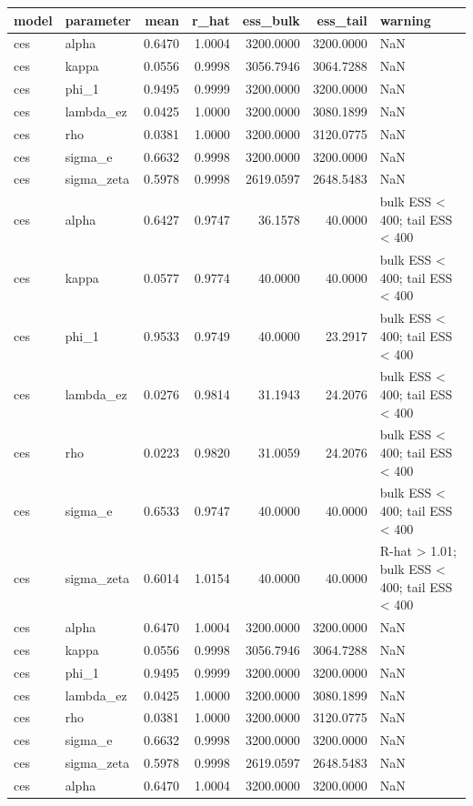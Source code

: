 \begin{tabular}{llrrrrl}
\toprule
model & parameter & mean & r\_hat & ess\_bulk & ess\_tail & warning \\
\midrule
ces & alpha & 0.6470 & 1.0004 & 3200.0000 & 3200.0000 & NaN \\
ces & kappa & 0.0556 & 0.9998 & 3056.7946 & 3064.7288 & NaN \\
ces & phi\_1 & 0.9495 & 0.9999 & 3200.0000 & 3200.0000 & NaN \\
ces & lambda\_ez & 0.0425 & 1.0000 & 3200.0000 & 3080.1899 & NaN \\
ces & rho & 0.0381 & 1.0000 & 3200.0000 & 3120.0775 & NaN \\
ces & sigma\_e & 0.6632 & 0.9998 & 3200.0000 & 3200.0000 & NaN \\
ces & sigma\_zeta & 0.5978 & 0.9998 & 2619.0597 & 2648.5483 & NaN \\
ces & alpha & 0.6427 & 0.9747 & 36.1578 & 40.0000 & bulk ESS < 400; tail ESS < 400 \\
ces & kappa & 0.0577 & 0.9774 & 40.0000 & 40.0000 & bulk ESS < 400; tail ESS < 400 \\
ces & phi\_1 & 0.9533 & 0.9749 & 40.0000 & 23.2917 & bulk ESS < 400; tail ESS < 400 \\
ces & lambda\_ez & 0.0276 & 0.9814 & 31.1943 & 24.2076 & bulk ESS < 400; tail ESS < 400 \\
ces & rho & 0.0223 & 0.9820 & 31.0059 & 24.2076 & bulk ESS < 400; tail ESS < 400 \\
ces & sigma\_e & 0.6533 & 0.9747 & 40.0000 & 40.0000 & bulk ESS < 400; tail ESS < 400 \\
ces & sigma\_zeta & 0.6014 & 1.0154 & 40.0000 & 40.0000 & R-hat > 1.01; bulk ESS < 400; tail ESS < 400 \\
ces & alpha & 0.6470 & 1.0004 & 3200.0000 & 3200.0000 & NaN \\
ces & kappa & 0.0556 & 0.9998 & 3056.7946 & 3064.7288 & NaN \\
ces & phi\_1 & 0.9495 & 0.9999 & 3200.0000 & 3200.0000 & NaN \\
ces & lambda\_ez & 0.0425 & 1.0000 & 3200.0000 & 3080.1899 & NaN \\
ces & rho & 0.0381 & 1.0000 & 3200.0000 & 3120.0775 & NaN \\
ces & sigma\_e & 0.6632 & 0.9998 & 3200.0000 & 3200.0000 & NaN \\
ces & sigma\_zeta & 0.5978 & 0.9998 & 2619.0597 & 2648.5483 & NaN \\
ces & alpha & 0.6470 & 1.0004 & 3200.0000 & 3200.0000 & NaN \\

\end{tabular}
